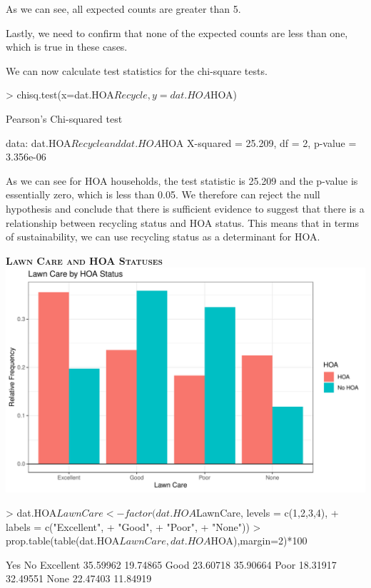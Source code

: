 \documentclass{article}
\begin{document}
As we can see, all expected counts are greater than 5.

Lastly, we need to confirm that none of the expected counts are less than one, which is true in these cases. 

We can now calculate test statistics for the chi-square tests. 
\begin{Schunk}
\begin{Sinput}
> chisq.test(x=dat.HOA$Recycle,y=dat.HOA$HOA)
\end{Sinput}
\begin{Soutput}
	Pearson's Chi-squared test

data:  dat.HOA$Recycle and dat.HOA$HOA
X-squared = 25.209, df = 2, p-value = 3.356e-06
\end{Soutput}
\end{Schunk}

As we can see for HOA households, the test statistic is 25.209 and the p-value is essentially zero, which is less than 0.05. We therefore can reject the null hypothesis and conclude that there is sufficient evidence to suggest that there is a relationship between recycling status and HOA status. This means that in terms of sustainability, we can use recycling status as a determinant for HOA.

\newpage
\textsc{\textbf{Lawn Care and HOA Statuses}}
\newline
\newline
\includegraphics{exam22-013}

\begin{Schunk}
\begin{Sinput}
> dat.HOA$LawnCare<-factor(dat.HOA$LawnCare, levels = c(1,2,3,4),
+                         labels = c("Excellent",
+                         "Good",
+                         "Poor",
+                         "None"))
> prop.table(table(dat.HOA$LawnCare, dat.HOA$HOA),margin=2)*100
\end{Sinput}
\begin{Soutput}
                 Yes       No
  Excellent 35.59962 19.74865
  Good      23.60718 35.90664
  Poor      18.31917 32.49551
  None      22.47403 11.84919
\end{Soutput}
\end{Schunk}
\end{document}
